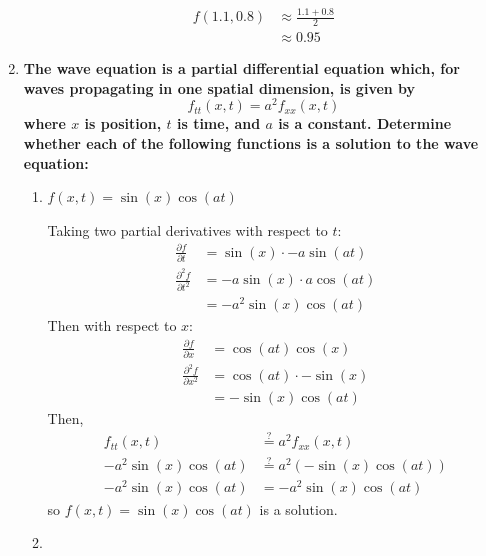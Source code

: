 \documentclass[11pt]{article}
\begin{document}
\begin{enumerate}[label=\textbf{\arabic*.}]
{\begin{enumerate}[label=\textbf{(\alph*)}]
{\begin{align*}
                        f(1.1,0.8)&\approx\frac{1.1+0.8}{2} \\
                        &\approx0.95
                    \end{align*}
                }
            \end{enumerate}
        }
        \pagebreak
        \item{
            \textbf{\boldmath The wave equation is a partial differential equation which, for waves propagating in one spatial dimension, is given by \[f_{tt}(x,t)=a^2f_{xx}(x,t)\] where \(x\) is position, \(t\) is time, and \(a\) is a constant. Determine whether each of the following functions is a solution to the wave equation:}
            \begin{enumerate}[label=\textbf{(\alph*)}]
                \item{
                    \textbf{\boldmath \(f(x,t)=\sin(x)\cos(at)\)}
                    \par
                    Taking two partial derivatives with respect to \(t\):
                    \begin{align*}
                        \frac{\partial f}{\partial t}&=\sin(x)\cdot-a\sin(at) \\
                        \frac{\partial^2f}{\partial t^2}&=-a\sin(x)\cdot a\cos(at) \\
                        &=-a^2\sin(x)\cos(at)
                    \end{align*}
                    Then with respect to \(x\):
                    \begin{align*}
                        \frac{\partial f}{\partial x}&=\cos(at)\cos(x) \\
                        \frac{\partial^2f}{\partial x^2}&=\cos(at)\cdot-\sin(x) \\
                        &=-\sin(x)\cos(at)
                    \end{align*}
                    Then,
                    \begin{align*}
                        f_{tt}(x,t)&\stackrel{?}{=}a^2f_{xx}(x,t) \\
                        -a^2\sin(x)\cos(at)&\stackrel{?}{=}a^2(-\sin(x)\cos(at)) \\
                        -a^2\sin(x)\cos(at)&=-a^2\sin(x)\cos(at)
                    \end{align*}
                    so \(f(x,t)=\sin(x)\cos(at)\) is a solution.
                }
                \item{
}
\end{enumerate}}
\end{enumerate}
\end{document}
